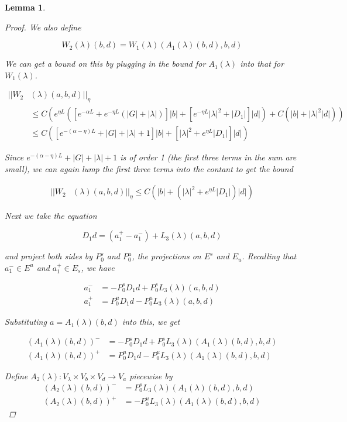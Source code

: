 \documentclass[12pt]{article}
\newtheorem{lemma}{Lemma}
\begin{document}
\begin{lemma}
\begin{proof}
We also define

\begin{equation}\label{W2def}
W_2(\lambda)(b,d) = W_1(\lambda)(A_1(\lambda)(b,d),b,d)
\end{equation}

We can get a bound on this by plugging in the bound for $A_1(\lambda)$ into that for $W_1(\lambda)$.

\begin{align*}
||W_2&(\lambda)(a,b,d)||_\eta \\
&\leq C\left( e^{\eta L} \left( \left[e^{-\alpha L} + e^{-\eta L} \left(|G| + |\lambda|\right) \right]|b| + \left[ e^{-\eta L} |\lambda|^2 + |D_1| \right] |d| \right) + C( |b| + |\lambda|^2 |d| ) \right)\\
&\leq C \left( \left[e^{-(\alpha-\eta) L} + |G| + |\lambda| + 1 \right] |b| 
+ \left[ |\lambda|^2 + e^{\eta L}|D_1| \right] |d|\right)
\end{align*} 

Since $e^{-(\alpha-\eta) L} + |G| + |\lambda| + 1$ is of order 1 (the first three terms in the sum are small), we can again lump the first three terms into the contant to get the bound

\begin{align*}
||W_2&(\lambda)(a,b,d)||_\eta \leq C \left( |b| + \left( |\lambda|^2 + e^{\eta L}|D_1| \right) |d|\right)
\end{align*} 

Next we take the equation

\[
D_1 d = (a^+_1 - a^-_1) + L_3(\lambda)(a,b,d)
\]

and project both sides by $P_0^s$ and $P_0^u$, the projections on $E^s$ and $E_u$. Recalling that $a^-_1 \in E^u$ and $a^+_1 \in E_s$, we have

\begin{align*}
a^-_1 &= -P_0^s D_1 d + P_0^s L_3(\lambda)(a,b,d) \\
a^+_1 &= P_0^u D_1 d - P_0^u L_3(\lambda)(a,b,d)
\end{align*}

Substituting $a = A_1(\lambda)(b,d)$ into this, we get

\begin{align*}
(A_1(\lambda)(b,d))^- &= -P_0^s D_1 d + P_0^s L_3(\lambda)(A_1(\lambda)(b,d),b,d) \\
(A_1(\lambda)(b,d))^+ &= P_0^u D_1 d - P_0^u L_3(\lambda)(A_1(\lambda)(b,d),b,d)
\end{align*}

Define $A_2(\lambda): V_\lambda \times V_b \times V_d \rightarrow V_a$ piecewise by
\begin{align*}
(A_2(\lambda)(b,d))^- &= P_0^s L_3(\lambda)(A_1(\lambda)(b,d),b,d) \\
(A_2(\lambda)(b,d))^+ &= - P_0^u L_3(\lambda)(A_1(\lambda)(b,d),b,d)
\end{align*}


\end{proof}
\end{lemma}
\end{document}
